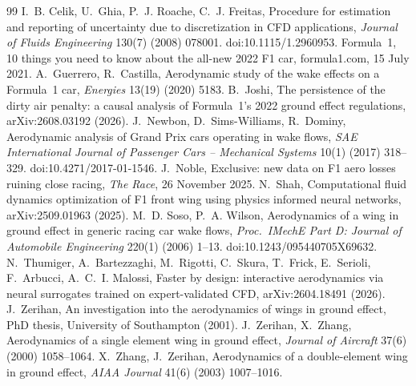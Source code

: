 \documentclass[11pt,a4paper]{article}
\begin{document}
\begin{thebibliography}{99}\small
{} I.~B. Celik, U.~Ghia, P.~J. Roache, C.~J. Freitas, Procedure for estimation and reporting of uncertainty due to discretization in CFD applications, \emph{Journal of Fluids Engineering} 130(7) (2008) 078001. doi:10.1115/1.2960953.
 Formula~1, 10 things you need to know about the all-new 2022 F1 car, formula1.com, 15 July 2021.
 A.~Guerrero, R.~Castilla, Aerodynamic study of the wake effects on a Formula~1 car, \emph{Energies} 13(19) (2020) 5183.
 B.~Joshi, The persistence of the dirty air penalty: a causal analysis of Formula~1's 2022 ground effect regulations, arXiv:2608.03192 (2026).
 J.~Newbon, D.~Sims-Williams, R.~Dominy, Aerodynamic analysis of Grand Prix cars operating in wake flows, \emph{SAE International Journal of Passenger Cars -- Mechanical Systems} 10(1) (2017) 318--329. doi:10.4271/2017-01-1546.
 J.~Noble, Exclusive: new data on F1 aero losses ruining close racing, \emph{The Race}, 26 November 2025.
 N.~Shah, Computational fluid dynamics optimization of F1 front wing using physics informed neural networks, arXiv:2509.01963 (2025).
 M.~D. Soso, P.~A. Wilson, Aerodynamics of a wing in ground effect in generic racing car wake flows, \emph{Proc.\ IMechE Part D: Journal of Automobile Engineering} 220(1) (2006) 1--13. doi:10.1243/095440705X69632.
 N.~Thumiger, A.~Bartezzaghi, M.~Rigotti, C.~Skura, T.~Frick, E.~Serioli, F.~Arbucci, A.~C.~I. Malossi, Faster by design: interactive aerodynamics via neural surrogates trained on expert-validated CFD, arXiv:2604.18491 (2026).
 J.~Zerihan, An investigation into the aerodynamics of wings in ground effect, PhD thesis, University of Southampton (2001).
 J.~Zerihan, X.~Zhang, Aerodynamics of a single element wing in ground effect, \emph{Journal of Aircraft} 37(6) (2000) 1058--1064.
 X.~Zhang, J.~Zerihan, Aerodynamics of a double-element wing in ground effect, \emph{AIAA Journal} 41(6) (2003) 1007--1016.
\end{thebibliography}
\end{document}
